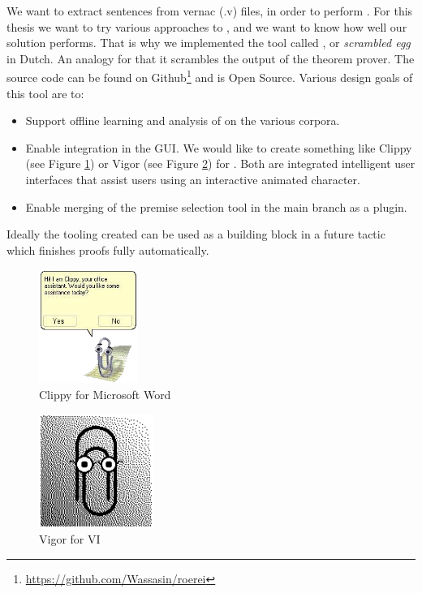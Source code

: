 We want to extract \pcic sentences from \coq vernac (.v) files, in order to perform \premiseselection.
For this thesis we want to try various approaches to \premiseselection,
and we want to know how well our solution performs.
That is why we implemented the \premiseselection tool called \roerei, or \emph{scrambled egg} in Dutch.
An analogy for that it scrambles the output of the \coq theorem prover.
The source code can be found on Github\footnote{\url{https://github.com/Wassasin/roerei}} and is Open Source.
Various design goals of this tool are to:
\begin{itemize}
    \item Support offline learning and analysis of \machinelearning on the various corpora.
    \item Enable integration in the \coqide GUI.
		We would like to create something like Clippy (see Figure \ref{figure:clippy}) or Vigor (see Figure \ref{figure:vigor}) for \coq.
		Both are integrated intelligent user interfaces that assist users using an interactive animated character.
    \item Enable merging of the premise selection tool in the \coq main branch as a plugin.
\end{itemize}
Ideally the tooling created can be used as a building block in a future \coq tactic which finishes proofs fully automatically.

\begin{center}
	\begin{minipage}{0.49\linewidth}
		\begin{figure}[H]
			\centerline{\includegraphics[height=10em]{assets/clippy.png}}
			\caption{Clippy for Microsoft Word}
			\label{figure:clippy}
		\end{figure}
	\end{minipage}
	\begin{minipage}{0.49\linewidth}
		\begin{figure}[H]
			\centerline{\includegraphics[height=10em]{assets/vigor.png}}
			\caption{Vigor for VI}
			\label{figure:vigor}
		\end{figure}
	\end{minipage}
\end{center}

